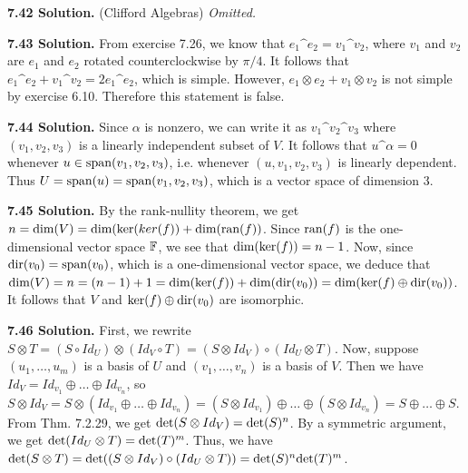 \textbf{7.42 Solution.} (Clifford Algebras) \textit{Omitted.}

\textbf{7.43 Solution.} From exercise 7.26, we know that $e_1 \^ e_2 = v_1 \^ v_2$, where $v_1$ and $v_2$ are $e_1$ and $e_2$ rotated counterclockwise by $\pi/4$. It follows that $e_1 \^ e_2 + v_1 \^ v_2 = 2e_1 \^ e_2$, which is simple. However, $e_1 \otimes e_2 + v_1 \otimes v_2$ is not simple by exercise 6.10. Therefore this statement is false.

\textbf{7.44 Solution.} Since $\alpha$ is nonzero, we can write it as $v_1 \^ v_2 \^ v_3$ where $(v_1, v_2, v_3)$ is a linearly independent subset of $V$. It follows that $u \^ \alpha = 0$ whenever $u \in \text{span}(v_1, v_2, v_3)$, i.e. whenever $(u, v_1, v_2, v_3)$ is linearly dependent. Thus $U = \text{span}(u) = \text{span}(v_1, v_2, v_3)$, which is a vector space of dimension 3.

\textbf{7.45 Solution.} By the rank-nullity theorem, we get $ n = \text{dim}(V) = \text{dim}(\text{ker}(ker(f)) + \text{dim}(\text{ran}(f))$. Since $\text{ran}(f)$ is the one-dimensional vector space $\mathbb{F}$, we see that $\text{dim}(\text{ker}(f)) = n - 1$. Now, since $\text{dir}(v_0) = \text{span}(v_0)$, which is a one-dimensional vector space, we deduce that $\text{dim}(V) = n = (n - 1) + 1 = \text{dim}(\text{ker}(f)) + \text{dim}(\text{dir}(v_0)) = \text{dim}(\text{ker}(f) \oplus \text{dir}(v_0))$. It follows that $V$ and $\text{ker}(f) \oplus \text{dir}(v_0)$ are isomorphic.

\textbf{7.46 Solution.} First, we rewrite $S \otimes T = (S \circ Id_U) \otimes (Id_V \circ T) = (S \otimes Id_V) \circ (Id_U \otimes T)$. Now, suppose $(u_1, \dots, u_m)$ is a basis of $U$ and $(v_1, \dots, v_n)$ is a basis of $V$. Then we have $Id_V = Id_{v_1} \oplus \dots \oplus Id_{v_n}$, so $S \otimes Id_V = S \otimes (Id_{v_1} \oplus \dots \oplus Id_{v_n}) = (S \otimes Id_{v_1}) \oplus \dots \oplus (S \otimes Id_{v_n}) = S \oplus \dots \oplus S$. From Thm. 7.2.29, we get $\text{det}(S \otimes Id_V) = \text{det}(S)^n$. By a symmetric argument, we get $\text{det}(Id_U \otimes T) = \text{det}(T)^m$. Thus, we have $\text{det}(S \otimes T) = \text{det}((S \otimes Id_V) \circ (Id_U \otimes T)) = \text{det}(S)^n\text{det}(T)^m$.

